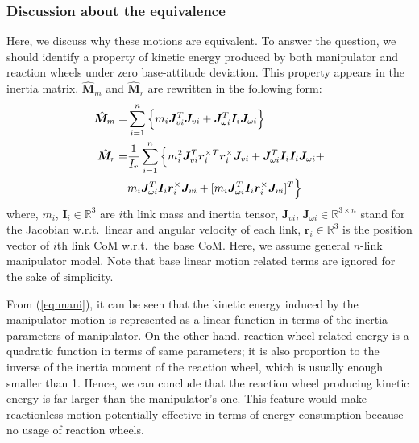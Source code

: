 \documentclass[preprint,12pt]{elsarticle}
\def\eq#1{{(\ref{eq:#1})}}
\def\R#1{{\in\mathbb{R}^{#1}}}
\begin{document}
\subsubsection{Discussion about the equivalence}
\label{sec:DISCUSS}
Here, we discuss why these motions are equivalent.
To answer the question, we should identify a property of kinetic energy 
produced by both manipulator and reaction wheels under zero base-attitude deviation.
This property appears in the inertia matrix.
$\hat{\bm{M}}_{m}$ and
$\hat{\bm{M}}_{r}$ are rewritten in the following form:
%
\begin{align}
  \hat{\bm{M}}_{m} = &\sum_{i=1}^{n}\Big\{m_{i}\bm{J}_{vi}^{T}\bm{J}_{vi} + \bm{J}_{\omega i}^{T}\bm{I}_{i}\bm{J}_{\omega i}\Big\}\label{eq:mani}\\
  \hat{\bm{M}}_{r} = &\frac{1}{I_{r}}\sum_{i=1}^{n}\Big\{m_{i}^{2}\bm{J}_{v i}^{T}\bm{r}_{i}^{\times}{}^{T}\bm{r}_{i}^{\times}\bm{J}_{vi}+
\bm{J}^{T}_{\omega i}\bm{I}_{i}\bm{I}_{i}\bm{J}_{\omega i} +\notag\\
  &m_{i}\bm{J}_{\omega i}^{T}\bm{I}_{i}\bm{r}_{i}^{\times}\bm{J}_{vi} + [ m_{i}\bm{J}_{\omega i}^{T}\bm{I}_{i}\bm{r}_{i}^{\times}\bm{J}_{vi}]^{T}\Big\}\label{eq:rw}
\end{align}
%
where, $m_{i}$, $\bm{I}_{i}\R{3}$ are $i$th link mass and inertia tensor,
$\bm{J}_{vi}$,
$\bm{J}_{\omega i}\R{3 \times n}$ stand for the Jacobian w.r.t.\ linear and angular velocity of each link,
$\bm{r}_{i}\R{3}$ is the position vector of $i$th link CoM w.r.t.\ the base CoM.
Here, we assume general $n$-link manipulator model.
Note that base linear motion related terms are ignored for the sake of simplicity.

From \eq{mani},
it can be seen that the kinetic energy induced by the manipulator motion is represented
as a linear function in terms of the inertia parameters of manipulator.
On the other hand,
reaction wheel related energy is a quadratic function in terms of same parameters;
it is also proportion to the inverse of the inertia moment of the reaction wheel,
which is usually enough smaller than 1.
Hence, we can conclude that the reaction wheel producing kinetic energy is far larger than the manipulator's one.
This feature would make reactionless motion potentially effective in terms of energy consumption because no usage of
reaction wheels.
\end{document}

